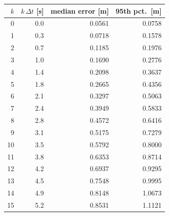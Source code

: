 \begin{tabular}{rrrr}
  \toprule
  $k$ & $k\,\Delta t$ [s] & median error [m] & 95th pct.\ [m] \\
  \midrule
  0 & 0.0 & 0.0561 & 0.0758 \\
  1 & 0.3 & 0.0718 & 0.1578 \\
  2 & 0.7 & 0.1185 & 0.1976 \\
  3 & 1.0 & 0.1690 & 0.2776 \\
  4 & 1.4 & 0.2098 & 0.3637 \\
  5 & 1.8 & 0.2665 & 0.4356 \\
  6 & 2.1 & 0.3297 & 0.5063 \\
  7 & 2.4 & 0.3949 & 0.5833 \\
  8 & 2.8 & 0.4572 & 0.6416 \\
  9 & 3.1 & 0.5175 & 0.7279 \\
  10 & 3.5 & 0.5792 & 0.8000 \\
  11 & 3.8 & 0.6353 & 0.8714 \\
  12 & 4.2 & 0.6937 & 0.9295 \\
  13 & 4.5 & 0.7548 & 0.9995 \\
  14 & 4.9 & 0.8148 & 1.0673 \\
  15 & 5.2 & 0.8531 & 1.1121 \\
  \bottomrule
\end{tabular}
